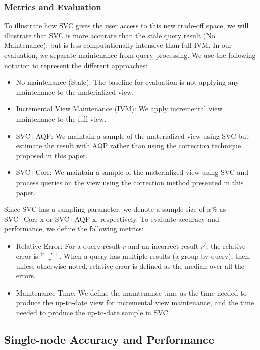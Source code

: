 \subsubsection{Metrics and Evaluation}
To illustrate how SVC gives the user access to this new trade-off space, we will illustrate that SVC is more accurate than the stale query result (No Maintenance); but is less computationally intensive than full IVM. 
In our evaluation, we separate maintenance from query processing.
We use the following notation to represent the different approaches:
\begin{itemize}[noitemsep]
\item No maintenance (Stale): The baseline for evaluation is not applying any maintenance to the materialized view.
\item Incremental View Maintenance (IVM): We apply incremental view maintenance to the full view.
\item SVC+AQP: We maintain a sample of the materialized view using SVC but estimate the result with AQP rather than using 
the correction technique proposed in this paper.
\item SVC+Corr: We maintain a sample of the materialized view using SVC and process queries on the view using the correction method presented in this paper.
\end{itemize}
Since SVC has a sampling parameter, we denote a sample size of $x \% $ as SVC+Corr-x or SVC+AQP-x, respectively. 
To evaluate accuracy and performance, we define the following metrics:
\begin{itemize}[noitemsep]
\item Relative Error: For a query result $r$ and an incorrect result $r'$, the relative error is $\frac{\mid r-r' \mid}{r}.$
When a query has multiple results (a group-by query), then, unless otherwise noted, relative error is defined as the median over all the errors.
\item Maintenance Time: We define the maintenance time as the time needed to produce the up-to-date view for incremental view maintenance, and the time needed to produce the up-to-date sample in SVC. 
\end{itemize}

\subsection{Single-node Accuracy and Performance}

